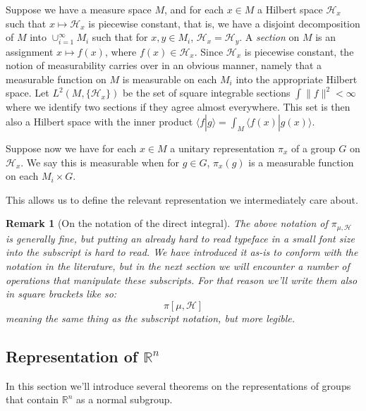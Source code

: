 \documentclass[
  12pt
]{article}
\theoremstyle{plain}
\newtheorem*{rk}{Remark}
\newcommand{\bbr}{\ensuremath{\mathbb{R}}\xspace}
\newcommand{\hilb}{\ensuremath{\mathscr{H}}\xspace}
\begin{document}
  Suppose we have a measure space $M$, and for each $x \in M$ a
  Hilbert space $\mathscr{H}_x$ such that $x \mapsto \mathscr{H}_x$ is
  piecewise constant, that is, we have a disjoint decomposition of $M$
  into $\cup_{i=1}^{\infty} M_i$ such that for $x,y \in M_i$,
  $\mathscr{H}_x = \mathscr{H}_y$. 
  A \emph{section} on $M$ is an assignment $x \mapsto f(x)$, where
  $f(x) \in \mathscr{H}_x$. Since $\mathscr{H}_x$ is piecewise
  constant, the notion of measurability carries over in an obvious manner,
  namely that a measurable function on $M$ is measurable on each $M_i$
  into the appropriate Hilbert space. Let $L^2(M, \{\mathscr{H}_x\})$ be
  the set of square integrable sections $\int \| f \|^2 < \infty$ where
  we identify two sections if they agree almost everywhere. This set is
  then also a Hilbert space with the inner product
  $\langle f | g \rangle = \int_M \langle f(x) | g(x) \rangle$.

  Suppose now we have for each $x \in M$ a unitary representation
  $\pi_x$ of a group $G$ on $\mathscr{H}_x$. We say this is
  measurable when for $g \in G$, $\pi_x(g)$ is a measurable function
  on each $M_i \times G$.

  This allows us to define the relevant representation we intermediately
  care about.

  \begin{rk}[On the notation of the direct integral]
    \label{rem:integral-notation}
    The above notation of $\pi_{\mu, \hilb}$ is generally fine, but putting an
    already hard to read typeface in a small font size into the subscript is
    hard to read. We have introduced it as-is to conform with the notation in
    the literature, but in the next section we will encounter a number of
    operations that manipulate these subscripts. For that reason we'll write
    them also in square brackets like so:
    $$
    \pi[\mu, \hilb]
    $$
    meaning the same thing as the subscript notation, but more legible.
  \end{rk}



  \hypertarget{representation-of-rn}{%
  \subsection{Representation of \texorpdfstring{$\bbr^n$}{R\^{}n}}\label{representation-of-rn}}


  In this section we'll introduce several theorems on the representations of
  groups that contain $\bbr^n$ as a normal subgroup.
\end{document}
